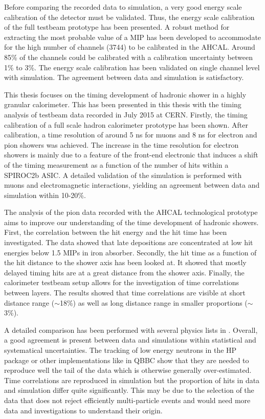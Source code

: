 Before comparing the recorded data to simulation, a very good energy scale calibration of the detector must be validated. Thus, the energy scale calibration of the full testbeam prototype has been presented. A robust method for extracting the most probable value of a MIP has been developed to accommodate for the high number of channels (3744) to be calibrated in the AHCAL. Around 85\% of the channels could be calibrated with a calibration uncertainty between 1\% to 3\%. The energy scale calibration has been validated on single channel level with simulation. The agreement between data and simulation is satisfactory.

This thesis focuses on the timing development of hadronic shower in a highly granular calorimeter. This has been presented in this thesis with the timing analysis of testbeam data recorded in July 2015 at CERN. Firstly, the timing calibration of a full scale hadron calorimeter prototype has been shown. After calibration, a time resolution of around 5 ns for muons and 8 ns for electron and pion showers was achieved. The increase in the time resolution for electron showers is mainly due to a feature of the front-end electronic that induces a shift of the timing measurement as a function of the number of hits within a SPIROC2b ASIC.
A detailed validation of the simulation is performed with muons and electromagnetic interactions, yielding an agreement between data and simulation within 10-20\%.

The analysis of the pion data recorded with the AHCAL technological prototype aims to improve our understanding of the time development of hadronic showers. First, the correlation between the hit energy and the hit time has been investigated. The data showed that late depositions are concentrated at low hit energies below 1.5 MIPs in iron absorber. Secondly, the hit time as a function of the hit distance to the shower axis has been looked at. It showed that mostly delayed timing hits are at a great distance from the shower axis. Finally, the calorimeter testbeam setup allows for the investigation of time correlations between layers. The results showed that time correlations are visible at short distance range ($\sim$18\%) as well as long distance range in smaller proportions ($\sim$3\%).

A detailed comparison has been performed with several physics lists in \geant. Overall, a good agreement is present between data and simulations within statistical and systematical uncertainties. The tracking of low energy neutrons in the HP package or other implementations like in QBBC show that they are needed to reproduce well the tail of the data which is otherwise generally over-estimated. Time correlations are reproduced in simulation but the proportion of hits in data and simulation differ quite significantly. This may be due to the selection of the data that does not reject efficiently multi-particle events and would need more data and investigations to understand their origin.

